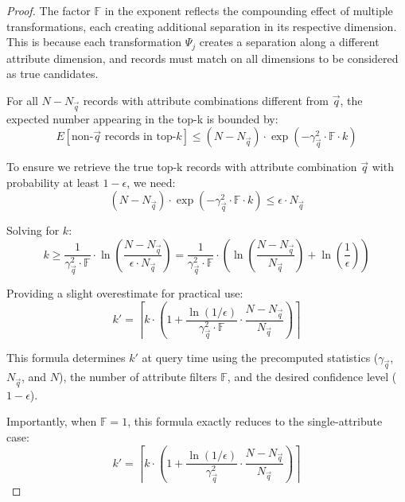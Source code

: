 \documentclass[numbers,sort]{article}
\begin{document}
\begin{proof}
The factor $\mathbb{F}$ in the exponent reflects the compounding effect of multiple transformations, each creating additional separation in its respective dimension. This is because each transformation $\Psi_j$ creates a separation along a different attribute dimension, and records must match on all dimensions to be considered as true candidates.

For all $N - N_{\vec{q}}$ records with attribute combinations different from $\vec{q}$, the expected number appearing in the top-k is bounded by:
\begin{equation}
E[\text{non-}\vec{q} \text{ records in top-}k] \leq (N - N_{\vec{q}}) \cdot \exp(-\gamma_{\vec{q}}^2 \cdot \mathbb{F} \cdot k)
\end{equation}

To ensure we retrieve the true top-k records with attribute combination $\vec{q}$ with probability at least $1-\epsilon$, we need:
\begin{equation}
(N - N_{\vec{q}}) \cdot \exp(-\gamma_{\vec{q}}^2 \cdot \mathbb{F} \cdot k) \leq \epsilon \cdot N_{\vec{q}}
\end{equation}

Solving for $k$:
\begin{equation}
k \geq \frac{1}{\gamma_{\vec{q}}^2 \cdot \mathbb{F}} \cdot \ln\left(\frac{N - N_{\vec{q}}}{\epsilon \cdot N_{\vec{q}}}\right) = \frac{1}{\gamma_{\vec{q}}^2 \cdot \mathbb{F}} \cdot \left(\ln\left(\frac{N - N_{\vec{q}}}{N_{\vec{q}}}\right) + \ln\left(\frac{1}{\epsilon}\right)\right)
\end{equation}

Providing a slight overestimate for practical use:
\begin{equation}
k' = \left\lceil k \cdot \left(1 + \frac{\ln(1/\epsilon)}{\gamma_{\vec{q}}^2 \cdot \mathbb{F}} \cdot \frac{N - N_{\vec{q}}}{N_{\vec{q}}}\right) \right\rceil
\end{equation}

This formula determines $k'$ at query time using the precomputed statistics ($\gamma_{\vec{q}}$, $N_{\vec{q}}$, and $N$), the number of attribute filters $\mathbb{F}$, and the desired confidence level ($1-\epsilon$).

Importantly, when $\mathbb{F}=1$, this formula exactly reduces to the single-attribute case:
\begin{equation}
k' = \left\lceil k \cdot \left(1 + \frac{\ln(1/\epsilon)}{\gamma_{\vec{q}}^2} \cdot \frac{N - N_{\vec{q}}}{N_{\vec{q}}}\right) \right\rceil
\end{equation}


\end{proof}
\end{document}
